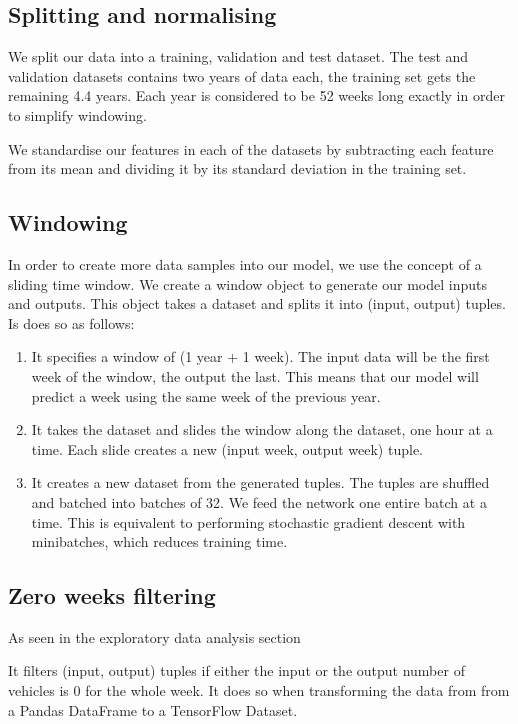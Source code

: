 \documentclass[10pt,conference,compsocconf]{IEEEtran}
\begin{document}
\subsection{Splitting and normalising}

We split our data into a training, validation and test dataset. The test and validation datasets contains two years of data each, the training set gets the remaining 4.4 years. Each year is considered to be 52 weeks long exactly in order to simplify windowing. 

We standardise our features in each of the datasets by subtracting each feature from its mean and dividing it by its standard deviation in the training set. 

\subsection{Windowing}

In order to create more data samples into our model, we use the concept of a sliding time window.
We create a window object to generate our model inputs and outputs. This object takes a dataset and 
splits it into (input, output) tuples. Is does so as follows:
\begin{enumerate}
    \item  It specifies a window of (1 year + 1 week). The input data will be the first week of the
    window, the output the last. This means that our model will predict a week using the same week 
    of the previous year.
    \item  It takes the dataset and slides the window along the dataset, one hour at a time. 
    Each slide creates a new (input week, output week) tuple.
    \item It creates a new dataset from the generated tuples. The tuples are shuffled and batched into
    batches of 32. We feed the network one entire batch at a time. This is equivalent to performing
    stochastic gradient descent with minibatches, which reduces training time.
\end{enumerate}

\subsection{Zero weeks filtering}

As seen in the exploratory data analysis section

It filters (input, output) tuples if either the input or the output number of vehicles is 0 for the whole week. It does so when transforming the data from from a Pandas DataFrame to a TensorFlow Dataset.
\end{document}
